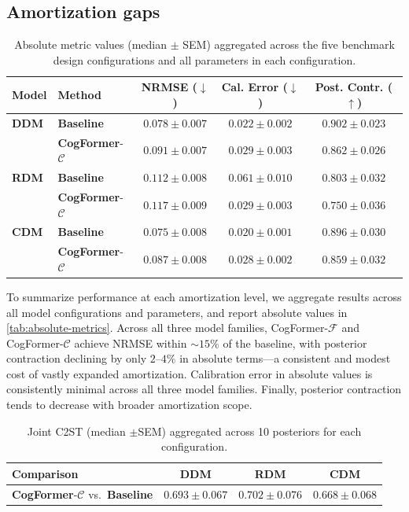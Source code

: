 \subsection{Amortization gaps}
\label{par:amortization-gaps}

\begin{table}[t]
\centering
\small
\caption{Absolute metric values (median $\pm$ SEM) aggregated across the five benchmark design configurations and all parameters in each configuration.}
\label{tab:absolute-metrics}
\begin{tabularx}{\textwidth}{llCCC}
\toprule
\textbf{Model} & \textbf{Method} & \textbf{NRMSE} ($\downarrow$) & \textbf{Cal. Error} ($\downarrow$) & \textbf{Post. Contr.} ($\uparrow$) \\
\midrule
\textbf{DDM} & \textbf{Baseline}& $0.078 \pm 0.007$ & $0.022 \pm 0.002$ & $0.902 \pm 0.023$ \\
 & \textbf{CogFormer}-$\mathcal{C}$& $0.091 \pm 0.007$ & $0.029 \pm 0.003$ & $0.862 \pm 0.026$ \\
\midrule
\textbf{RDM} &\textbf{Baseline} & $0.112 \pm 0.008$ & $0.061 \pm 0.010$ & $0.803 \pm 0.032$ \\
 & \textbf{CogFormer}-$\mathcal{C}$ & $0.117 \pm 0.009$ & $0.029 \pm 0.003$ & $0.750 \pm 0.036$ \\
\midrule
\textbf{CDM} & \textbf{Baseline} & $0.075 \pm 0.008$ & $0.020 \pm 0.001$ & $0.896 \pm 0.030$ \\
 & \textbf{CogFormer}-$\mathcal{C}$ & $0.087 \pm 0.008$ & $0.028 \pm 0.002$ & $0.859 \pm 0.032$ \\
\bottomrule
\end{tabularx}
\end{table}

To summarize performance at each amortization level, we aggregate results across all model configurations and parameters, and report absolute values in \autoref{tab:absolute-metrics}. Across
all three model families, CogFormer-$\mathcal{F}$ and CogFormer-$\mathcal{C}$ achieve NRMSE within ${\sim}15\%$ of the baseline, with posterior contraction declining by only $2$–$4\%$ in absolute terms---a consistent and modest cost of vastly expanded amortization. Calibration error in absolute values is consistently minimal across all three model families.
Finally, posterior contraction tends to decrease with broader amortization scope.

\begin{table}[t]
\centering
\small
\caption{Joint C2ST (median $\pm $SEM) aggregated across 10 posteriors for each configuration.}
\label{tab:c2st}
\begin{tabularx}{\textwidth}{lCCC}
\toprule
\textbf{Comparison} & \textbf{DDM} & \textbf{RDM} & \textbf{CDM} \\
\midrule
\textbf{CogFormer}-$\mathcal{C}$ vs.\ \textbf{Baseline} &  $0.693 \pm 0.067$& $0.702 \pm 0.076$  & $0.668 \pm 0.068$\\
\bottomrule
\end{tabularx}
\end{table}